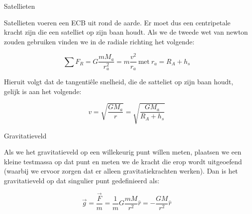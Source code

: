 \begin{app}[Satellieten]{Satellieten}

    Satellieten voeren een ECB uit rond de aarde. Er moet dus een centripetale kracht zijn die een satelliet op zijn baan houdt. Als we de tweede wet van newton zouden gebruiken vinden we in de radiale richting het volgende: 
    
    \begin{equation*}
        \sum F_R = G\dfrac{mM_a}{r_a^2} = m \dfrac{v^2}{r_a} \ \text{met} \ r_a = R_A + h_s
    \end{equation*}
    
    
    \noindent Hieruit volgt dat de tangentiêle snelheid, die de satteliet op zijn baan houdt, gelijk is aan het volgende:
    
    \begin{equation*}
        v = \sqrt{\dfrac{GM_a}{r}} = \sqrt{\dfrac{GM_a}{R_A + h_s}}
    \end{equation*}
    

\end{app}

\begin{theo}[Gravitatieveld]{Gravitatieveld}
    
    
    Als we het gravitatieveld op een willekeurig punt willen meten, plaatsen we een kleine testmassa op dat punt en meten we de kracht die erop wordt uitgeoefend (waarbij we ervoor zorgen dat er alleen gravitatiekrachten werken). Dan is het gravitatieveld op dat singulier punt gedefinieerd als: 
    
    \begin{equation*}
        \Vec{g} = \dfrac{\Vec{F}}{m} = \dfrac{1}{m}G\dfrac{mM}{r^2}\hat{r} = -\dfrac{GM}{r^2}\hat{r} 
    \end{equation*}

\end{theo}


    
